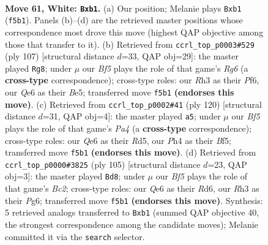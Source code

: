 \documentclass[11pt]{article}
\begin{document}
\clearpage

\begin{figure}[p]\centering
\begin{subfigure}{0.46\textwidth}\centering
\resizebox{\linewidth}{!}{%
\newchessgame
\chessboard[
  setfen={8/6k1/4Q3/5B2/7P/7R/6P1/1q4K1 w - - 0 61},
  showmover=false,
  pgfstyle=straightmove, color=movearrow, markmove={f5-b1}
]}
\caption{}
\end{subfigure}\hfill
\begin{subfigure}{0.46\textwidth}\centering
\resizebox{\linewidth}{!}{%
\newchessgame
\chessboard[
  setfen={5Q1k/7p/4Kp2/4b3/8/6r1/6P1/8 b - - 24 54},
  showmover=false,
  pgfstyle=straightmove, color=movearrow, markmove={g3-g8}
]}
\caption{}
\end{subfigure}
\\[4pt]
\begin{subfigure}{0.46\textwidth}\centering
\resizebox{\linewidth}{!}{%
\newchessgame
\chessboard[
  setfen={8/2k3r1/4R3/3R1B2/P7/KP6/8/5q2 w - - 15 61},
  showmover=false,
  pgfstyle=straightmove, color=movearrow, markmove={a4-a5}
]}
\caption{}
\end{subfigure}\hfill
\begin{subfigure}{0.46\textwidth}\centering
\resizebox{\linewidth}{!}{%
\newchessgame
\chessboard[
  setfen={8/1kb5/3r2p1/p7/6K1/2Q5/P6P/8 b - - 0 53},
  showmover=false,
  pgfstyle=straightmove, color=movearrow, markmove={c7-d8}
]}
\caption{}
\end{subfigure}
\caption{\textbf{Move 61, White: \texttt{Bxb1}.} (a) Our position; Melanie plays \texttt{Bxb1} (\texttt{f5b1}). Panels (b)--(d) are the retrieved master positions whose correspondence most drove this move (highest QAP objective among those that transfer to it). (b) Retrieved from \texttt{ccrl\_top\_p0003\#529} (ply 107) [structural distance $d$=33, QAP obj=29]: the master played \texttt{Rg8}; under $\mu$ our \emph{Bf5} plays the role of that game's \emph{Rg6} (a \textbf{cross-type} correspondence); cross-type roles: our \emph{R}h3 as their \emph{P}f6, our \emph{Q}e6 as their \emph{B}e5; transferred move \texttt{f5b1} \textbf{(endorses this move)}. (c) Retrieved from \texttt{ccrl\_top\_p0002\#41} (ply 120) [structural distance $d$=31, QAP obj=4]: the master played \texttt{a5}; under $\mu$ our \emph{Bf5} plays the role of that game's \emph{Pa4} (a \textbf{cross-type} correspondence); cross-type roles: our \emph{Q}e6 as their \emph{R}d5, our \emph{P}h4 as their \emph{B}f5; transferred move \texttt{f5b1} \textbf{(endorses this move)}. (d) Retrieved from \texttt{ccrl\_top\_p0000\#3825} (ply 105) [structural distance $d$=23, QAP obj=3]: the master played \texttt{Bd8}; under $\mu$ our \emph{Bf5} plays the role of that game's \emph{Bc2}; cross-type roles: our \emph{Q}e6 as their \emph{R}d6, our \emph{R}h3 as their \emph{P}g6; transferred move \texttt{f5b1} \textbf{(endorses this move)}. Synthesis: 5 retrieved analogs transferred to \texttt{Bxb1} (summed QAP objective 40, the strongest correspondence among the candidate moves); Melanie committed it via the \texttt{search} selector.}
\label{fig:thought-m120}
\end{figure}
\end{document}
